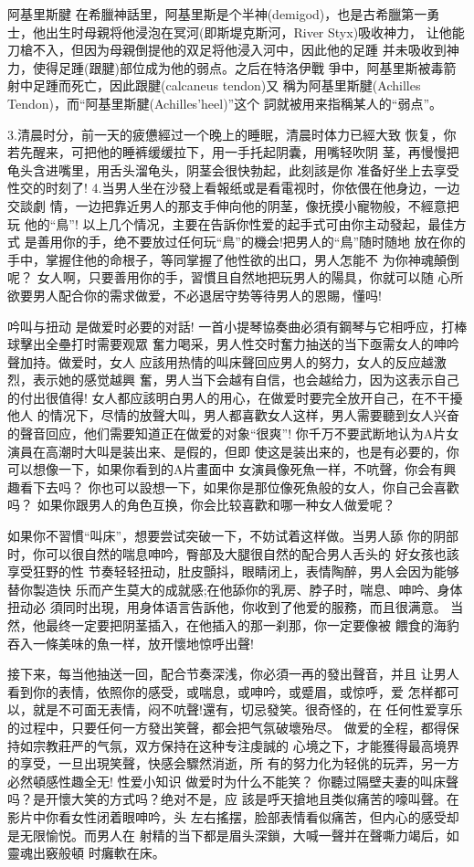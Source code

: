 \documentclass[12pt,UTF8]{ctexbook}
\begin{document}
阿基里斯腱
在希臘神話里，阿基里斯是个半神(demigod)，也是古希臘第一勇
士，他出生时母親将他浸泡在冥河(即斯堤克斯河，River Styx)吸收神力，
让他能刀槍不入，但因为母親倒提他的双足将他浸入河中，因此他的足踵
并未吸收到神力，使得足踵(跟腱)部位成为他的弱点。之后在特洛伊戰
爭中，阿基里斯被毒箭射中足踵而死亡，因此跟腱(calcaneus tendon)又
稱为阿基里斯腱(Achilles Tendon)，而“阿基里斯腱(Achilles'heel)”这个
詞就被用来指稱某人的“弱点”。

3.清晨时分，前一天的疲憊經过一个晚上的睡眠，清晨时体力已經大致
恢复，你若先醒来，可把他的睡裤缓缓拉下，用一手托起阴囊，用嘴轻吹阴
茎，再慢慢把龟头含进嘴里，用舌头溜龟头，阴茎会很快勃起，此刻該是你
准备好坐上去享受性交的时刻了!
4.当男人坐在沙發上看報纸或是看電视时，你依偎在他身边，一边交談劇
情，一边把靠近男人的那支手伸向他的阴茎，像抚摸小寵物般，不經意把玩
他的“鳥”!
以上几个情况，主要在告訴你性爱的起手式可由你主动發起，最佳方式
是善用你的手，绝不要放过任何玩“鳥”的機会!把男人的“鳥”随时随地
放在你的手中，掌握住他的命根子，等同掌握了他性欲的出口，男人怎能不
为你神魂顛倒呢？
女人啊，只要善用你的手，習慣且自然地把玩男人的陽具，你就可以随
心所欲要男人配合你的需求做爱，不必退居守势等待男人的恩賜，懂吗!

吟叫与扭动
是做爱时必要的对話!
一首小提琴協奏曲必須有鋼琴与它相呼应，打棒球擊出全壘打时需要观眾
奮力喝采，男人性交时奮力抽送的当下亟需女人的呻吟聲加持。做爱时，女人
应該用热情的叫床聲回应男人的努力，女人的反应越激烈，表示她的感觉越興
奮，男人当下会越有自信，也会越给力，因为这表示自己的付出很值得!
女人都应該明白男人的用心，在做爱时要完全放开自己，在不干擾他人
的情况下，尽情的放聲大叫，男人都喜歡女人这样，男人需要聽到女人兴奋
的聲音回应，他们需要知道正在做爱的对象“很爽”!
你千万不要武断地认为A片女演員在高潮时大叫是装出来、是假的，但即
使这是装出来的，也是有必要的，你可以想像一下，如果你看到的A片畫面中
女演員像死魚一样，不吭聲，你会有興趣看下去吗？
你也可以設想一下，如果你是那位像死魚般的女人，你自己会喜歡吗？
如果你跟男人的角色互换，你会比较喜歡和哪一种女人做爱呢？

如果你不習慣“叫床”，想要尝试突破一下，不妨试着这样做。当男人舔
你的阴部时，你可以很自然的喘息呻吟，臀部及大腿很自然的配合男人舌头的
好女孩也該享受狂野的性
节奏轻轻扭动，肚皮顫抖，眼睛闭上，表情陶醉，男人会因为能够替你製造快
乐而产生莫大的成就感;在他舔你的乳房、脖子时，喘息、呻吟、身体扭动必
須同时出現，用身体语言告訴他，你收到了他爱的服務，而且很满意。
当然，他最终一定要把阴茎插入，在他插入的那一刹那，你一定要像被
餵食的海豹吞入一條美味的魚一样，放开懷地惊呼出聲!

接下来，每当他抽送一回，配合节奏深浅，你必須一再的發出聲音，并且
让男人看到你的表情，依照你的感受，或喘息，或呻吟，或蹙眉，或惊呼，爱
怎样都可以，就是不可面无表情，闷不吭聲!還有，切忌發笑。很奇怪的，在
任何性爱享乐的过程中，只要任何一方發出笑聲，都会把气氛破壞殆尽。
做爱的全程，都得保持如宗教莊严的气氛，双方保持在这种专注虔誠的
心境之下，才能獲得最高境界的享受，一旦出現笑聲，快感会驟然消逝，所
有的努力化为轻佻的玩弄，另一方必然頓感性趣全无!
性爱小知识
做爱时为什么不能笑？
你聽过隔壁夫妻的叫床聲吗？是开懷大笑的方式吗？绝对不是，应
該是呼天搶地且类似痛苦的嚎叫聲。在影片中你看女性闭着眼呻吟，头
左右搖摆，脸部表情看似痛苦，但内心的感受却是无限愉悦。而男人在
射精的当下都是眉头深鎖，大喊一聲并在聲嘶力竭后，如靈魂出竅般頓
时癱軟在床。
\end{document}
